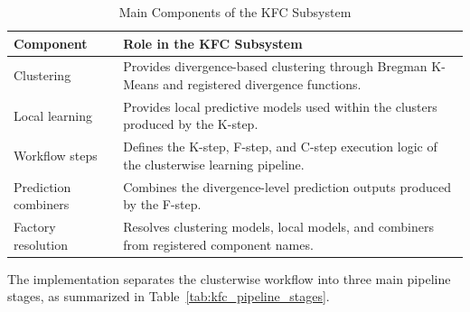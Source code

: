 \begin{table}[H]
      \centering
      \caption{Main Components of the KFC Subsystem}
      \label{tab:kfc_subsystem_architecture}
      \renewcommand{\arraystretch}{1.2}
      \begin{tabularx}{\textwidth}{
                  >{\raggedright\arraybackslash}p{3.5cm}
                  >{\raggedright\arraybackslash}X
            }
            \toprule
            \textbf{Component}   & \textbf{Role in the KFC Subsystem}                                         \\
            \midrule
            Clustering           &
            Provides divergence-based clustering through Bregman K-Means and registered divergence functions. \\

            Local learning       &
            Provides local predictive models used within the clusters produced by the K-step.                 \\

            Workflow steps       &
            Defines the K-step, F-step, and C-step execution logic of the clusterwise learning pipeline.      \\

            Prediction combiners &
            Combines the divergence-level prediction outputs produced by the F-step.                          \\

            Factory resolution   &
            Resolves clustering models, local models, and combiners from registered component names.          \\
            \bottomrule
      \end{tabularx}
\end{table}

The implementation separates the clusterwise workflow into three main pipeline stages, as summarized in Table~\ref{tab:kfc_pipeline_stages}.

